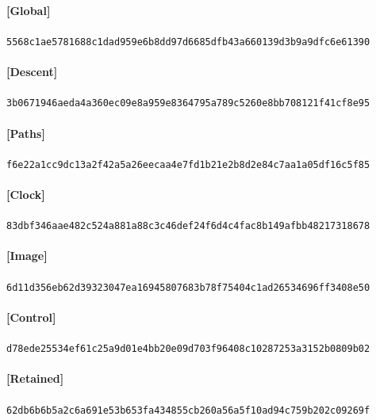 \documentclass[11pt]{article}
\begin{document}
\paragraph{[Global]} \par
{\small\texttt{5568c1ae5781688c1dad959e6b8dd97d6685dfb43a660139d3b9a9dfc6e61390}}
\paragraph{[Descent]} \par
{\small\texttt{3b0671946aeda4a360ec09e8a959e8364795a789c5260e8bb708121f41cf8e95}}
\paragraph{[Paths]} \par
{\small\texttt{f6e22a1cc9dc13a2f42a5a26eecaa4e7fd1b21e2b8d2e84c7aa1a05df16c5f85}}
\paragraph{[Clock]} \par
{\small\texttt{83dbf346aae482c524a881a88c3c46def24f6d4c4fac8b149afbb48217318678}}
\paragraph{[Image]} \par
{\small\texttt{6d11d356eb62d39323047ea16945807683b78f75404c1ad26534696ff3408e50}}
\paragraph{[Control]} \par
{\small\texttt{d78ede25534ef61c25a9d01e4bb20e09d703f96408c10287253a3152b0809b02}}
\paragraph{[Retained]} \par
{\small\texttt{62db6b6b5a2c6a691e53b653fa434855cb260a56a5f10ad94c759b202c09269f}}
\end{document}
